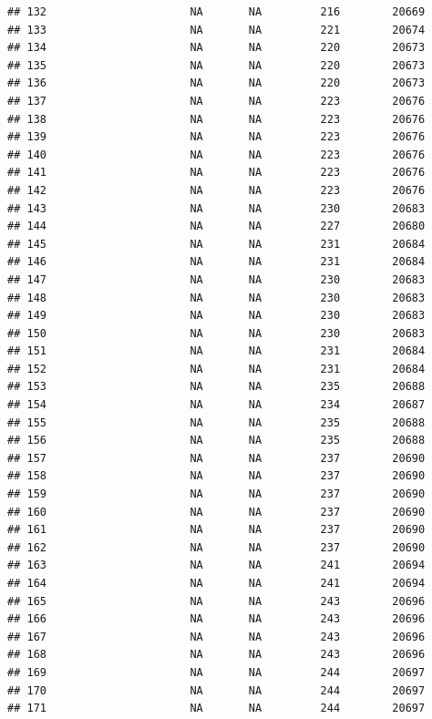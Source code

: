 \documentclass[
]{article}
\begin{document}
\begin{verbatim}
## 132                      NA       NA         216        20669
## 133                      NA       NA         221        20674
## 134                      NA       NA         220        20673
## 135                      NA       NA         220        20673
## 136                      NA       NA         220        20673
## 137                      NA       NA         223        20676
## 138                      NA       NA         223        20676
## 139                      NA       NA         223        20676
## 140                      NA       NA         223        20676
## 141                      NA       NA         223        20676
## 142                      NA       NA         223        20676
## 143                      NA       NA         230        20683
## 144                      NA       NA         227        20680
## 145                      NA       NA         231        20684
## 146                      NA       NA         231        20684
## 147                      NA       NA         230        20683
## 148                      NA       NA         230        20683
## 149                      NA       NA         230        20683
## 150                      NA       NA         230        20683
## 151                      NA       NA         231        20684
## 152                      NA       NA         231        20684
## 153                      NA       NA         235        20688
## 154                      NA       NA         234        20687
## 155                      NA       NA         235        20688
## 156                      NA       NA         235        20688
## 157                      NA       NA         237        20690
## 158                      NA       NA         237        20690
## 159                      NA       NA         237        20690
## 160                      NA       NA         237        20690
## 161                      NA       NA         237        20690
## 162                      NA       NA         237        20690
## 163                      NA       NA         241        20694
## 164                      NA       NA         241        20694
## 165                      NA       NA         243        20696
## 166                      NA       NA         243        20696
## 167                      NA       NA         243        20696
## 168                      NA       NA         243        20696
## 169                      NA       NA         244        20697
## 170                      NA       NA         244        20697
## 171                      NA       NA         244        20697

\end{verbatim}
\end{document}
